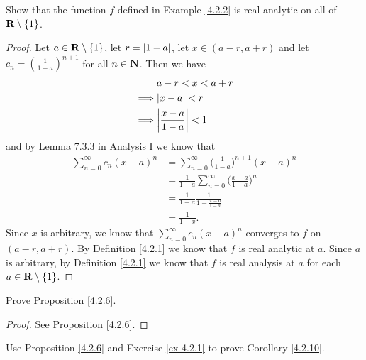 \begin{exercise}\label{ex 4.2.2}
    Show that the function \(f\) defined in Example \ref{4.2.2} is real analytic on all of \(\mathbf{R} \setminus \{1\}\).
\end{exercise}

\begin{proof}
    Let \(a \in \mathbf{R} \setminus \{1\}\), let \(r = \left\lvert1 - a\right\rvert\), let \(x \in (a - r, a + r)\) and let \(c_n = (\frac{1}{1 - a})^{n + 1}\) for all \(n \in \mathbf{N}\).
    Then we have
    \begin{align*}
                 & a - r < x < a + r             \\
        \implies & \abs{x - a} < r               \\
        \implies & \abs{\frac{x - a}{1 - a}} < 1
    \end{align*}
    and by Lemma 7.3.3 in Analysis I we know that
    \begin{align*}
        \sum_{n = 0}^\infty c_n (x - a)^n & = \sum_{n = 0}^\infty \bigg(\frac{1}{1 - a}\bigg)^{n + 1} (x - a)^n     \\
                                          & = \frac{1}{1 - a} \sum_{n = 0}^\infty \bigg(\frac{x - a}{1 - a}\bigg)^n \\
                                          & = \frac{1}{1 - a} \frac{1}{1 - \frac{x - a}{1 - a}}                     \\
                                          & = \frac{1}{1 - x}.
    \end{align*}
    Since \(x\) is arbitrary, we know that \(\sum_{n = 0}^\infty c_n (x - a)^n\) converges to \(f\) on \((a - r, a + r)\).
    By Definition \ref{4.2.1} we know that \(f\) is real analytic at \(a\).
    Since \(a\) is arbitrary, by Definition \ref{4.2.1} we know that \(f\) is real analysis at \(a\) for each \(a \in \mathbf{R} \setminus \{1\}\).
\end{proof}

\begin{exercise}\label{ex 4.2.3}
    Prove Proposition \ref{4.2.6}.
\end{exercise}

\begin{proof}
    See Proposition \ref{4.2.6}.
\end{proof}

\begin{exercise}\label{ex 4.2.4}
    Use Proposition \ref{4.2.6} and Exercise \ref{ex 4.2.1} to prove Corollary \ref{4.2.10}.
\end{exercise}

